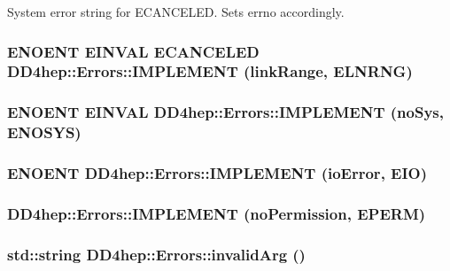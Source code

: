 System error string for ECANCELED. Sets errno accordingly. \hypertarget{namespace_d_d4hep_1_1_errors_ad826680faeb314dfa60c60a0d4ee3692}{
\subsubsection[{IMPLEMENT}]{\setlength{\rightskip}{0pt plus 5cm}ENOENT EINVAL ECANCELED DD4hep::Errors::IMPLEMENT (linkRange, \/  ELNRNG)}}
\label{namespace_d_d4hep_1_1_errors_ad826680faeb314dfa60c60a0d4ee3692}
\hypertarget{namespace_d_d4hep_1_1_errors_a7875dfba79f4c8a0fbc5b9786730ca20}{
\subsubsection[{IMPLEMENT}]{\setlength{\rightskip}{0pt plus 5cm}ENOENT EINVAL DD4hep::Errors::IMPLEMENT (noSys, \/  ENOSYS)}}
\label{namespace_d_d4hep_1_1_errors_a7875dfba79f4c8a0fbc5b9786730ca20}
\hypertarget{namespace_d_d4hep_1_1_errors_ae2932c4d59d7f6a7476733ba238050f6}{
\subsubsection[{IMPLEMENT}]{\setlength{\rightskip}{0pt plus 5cm}ENOENT DD4hep::Errors::IMPLEMENT (ioError, \/  EIO)}}
\label{namespace_d_d4hep_1_1_errors_ae2932c4d59d7f6a7476733ba238050f6}
\hypertarget{namespace_d_d4hep_1_1_errors_ada3397937d99e255f7b5770f5ab80888}{
\subsubsection[{IMPLEMENT}]{\setlength{\rightskip}{0pt plus 5cm}DD4hep::Errors::IMPLEMENT (noPermission, \/  EPERM)}}
\label{namespace_d_d4hep_1_1_errors_ada3397937d99e255f7b5770f5ab80888}
\hypertarget{namespace_d_d4hep_1_1_errors_ab559bb58296daa1eed2725c602cb2483}{
\subsubsection[{invalidArg}]{\setlength{\rightskip}{0pt plus 5cm}std::string DD4hep::Errors::invalidArg ()}}
\label{namespace_d_d4hep_1_1_errors_ab559bb58296daa1eed2725c602cb2483}


